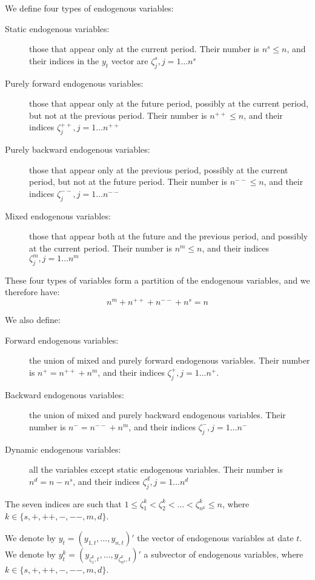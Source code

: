 \documentclass[11pt,a4paper]{article}
\begin{document}
We define four types of endogenous variables:
\begin{description}
\item[Static endogenous variables:] those that appear only at the current
  period. Their number is $n^s \leq n$, and their indices in the $y_t$ vector
  are $\zeta^s_j, j=1\ldots n^s$
\item[Purely forward endogenous variables:] those that appear only at the
  future period, possibly at the current period, but not at the previous
  period. Their number is $n^{++} \leq n$, and their indices $\zeta^{++}_j,
  j=1\ldots n^{++}$
\item[Purely backward endogenous variables:] those that appear only at the
  previous period, possibly at the current period, but not at the future
  period.  Their number is $n^{--} \leq n$, and their indices $\zeta^{--}_j,
  j=1\ldots n^{--}$
\item[Mixed endogenous variables:] those that appear both at the future and the
  previous period, and possibly at the current period.  Their number is $n^m
  \leq n$, and their indices $\zeta^m_j, j=1\ldots n^m$
\end{description}

These four types of variables form a partition of the endogenous variables, and
we therefore have:
\begin{equation*}
  n^m + n^{++} + n^{--} + n^s = n
\end{equation*}

We also define:
\begin{description}
\item[Forward endogenous variables:] the union of mixed and purely forward
  endogenous variables. Their number is $n^+ = n^{++} + n^m$, and their indices
  $\zeta^+_j, j=1\ldots n^+$.
\item[Backward endogenous variables:] the union of mixed and purely backward
  endogenous variables. Their number is $n^- = n^{--} + n^m$, and their indices
  $\zeta^-_j, j=1\ldots n^-$
\item[Dynamic endogenous variables:] all the variables except static endogenous
  variables. Their number is $n^d = n - n^s$, and their indices $\zeta^d_j,
  j=1\ldots n^d$
\end{description}

The seven indices are such that $1 \leq \zeta^k_1 < \zeta^k_2 < \ldots <
\zeta^k_{n^k} \leq n$, where $k \in \{ s, +, ++, -, --, m, d \}$.

We denote by $y_t = (y_{1,t}, \ldots, y_{n,t})'$ the vector of endogenous
variables at date $t$. We denote by $y^k_t = (y_{\zeta^k_1, t}, \ldots,
y_{\zeta^k_{n^k}, t})'$ a subvector of endogenous variables, where $k \in \{
s, +, ++, -, --, m, d \}$.
\end{document}
